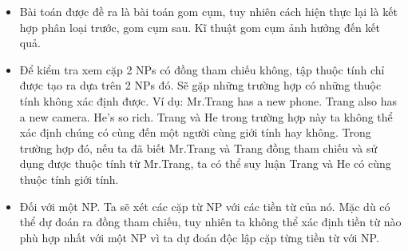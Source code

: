 \documentclass[12pt]{extarticle}
\begin{document}
					\begin{itemize}
						\item{Bài toán được đề ra là bài toán gom cụm, tuy nhiên cách hiện thực lại là kết hợp phân loại trước, gom cụm sau. Kĩ thuật gom cụm ảnh hưởng đến kết quả.}
						\item{Để kiểm tra xem cặp 2 NPs có đồng tham chiếu không, tập thuộc tính chỉ được tạo ra dựa trên 2 NPs đó. Sẽ gặp những trường hợp có những thuộc tính không xác định được. Ví dụ: Mr.Trang has a new phone. Trang also has a new camera. He’s so rich. Trang và He trong trường hợp này  ta không thể xác định chúng có cùng đến một người cùng giới tính hay không. Trong trường hợp đó, nếu ta đã biết Mr.Trang và Trang đồng tham chiếu và sử dụng được thuộc tính từ Mr.Trang, ta có thể suy luận Trang và He có cùng thuộc tính giới tính.}
						\item{Đối với một NP. Ta sẽ xét các cặp từ NP với các tiền từ của nó. Mặc dù có thể dự đoán ra đồng tham chiếu, tuy nhiên ta không thể xác định tiền từ nào phù hợp nhất với một NP vì ta dự đoán độc lập cặp từng tiền từ với NP.}
					\end{itemize}
\end{document}
